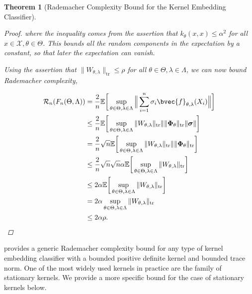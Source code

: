\documentclass{article}
\newtheorem{theorem}{Theorem}[section]
\begin{document}
\begin{theorem}[Rademacher Complexity Bound for the Kernel Embedding Classifier]
\begin{proof}
				where the inequality comes from the assertion that $k_{\theta}(x, x) \leq \alpha^{2}$ for all $x \in \mathcal{X}, \theta \in \Theta$. This bounds all the random components in the expectation by a constant, so that later the expectation can vanish. 
				
				Using the assertion that $\| W_{\theta, \lambda} \|_{\mathrm{tr}} \leq \rho$ for all $\theta \in \Theta, \lambda \in \Lambda$, we can now bound Rademacher complexity,
				
				\begin{equation}
					\begin{aligned}
						\mathcal{R}_{n}(F_{n}(\Theta, \Lambda)) &= \frac{2}{n} \mathbb{E}\bigg[\sup_{\theta \in \Theta, \lambda \in \Lambda} \Big\| \sum_{i = 1}^{n} \sigma_{i}\bvec{f}_{\theta, \lambda}(X_{i}) \Big\|\bigg] \\
						&\leq \frac{2}{n} \mathbb{E}\bigg[\sup_{\theta \in \Theta, \lambda \in \Lambda} \|  W_{\theta, \lambda} \|_{\mathrm{tr}} \| \| \bm{\Phi}_{\theta} \|_{\mathrm{tr}} \| \bm{\sigma} \| \bigg] \\
						&= \frac{2}{n} \sqrt{n} \mathbb{E}\bigg[\sup_{\theta \in \Theta, \lambda \in \Lambda} \|  W_{\theta, \lambda} \|_{\mathrm{tr}} \| \| \bm{\Phi}_{\theta} \|_{\mathrm{tr}} \bigg] \\
						&\leq \frac{2}{n} \sqrt{n} \sqrt{n} \alpha \mathbb{E}\bigg[\sup_{\theta \in \Theta, \lambda \in \Lambda} \|  W_{\theta, \lambda} \|_{\mathrm{tr}} \bigg] \\
						&\leq 2 \alpha \mathbb{E}\bigg[\sup_{\theta \in \Theta, \lambda \in \Lambda} \|  W_{\theta, \lambda} \|_{\mathrm{tr}} \bigg] \\
						&= 2 \alpha \sup_{\theta \in \Theta, \lambda \in \Lambda} \|  W_{\theta, \lambda} \|_{\mathrm{tr}} \\
						&\leq 2 \alpha \rho.
					\end{aligned}
				\end{equation}
			\end{proof}
		\end{theorem}
	
		 provides a generic Rademacher complexity bound for any type of kernel embedding classifier with a bounded positive definite kernel and bounded trace norm. One of the most widely used kernels in practice are the family of stationary kernels. We provide a more specific bound for the case of stationary kernels below.
		
\end{document}

